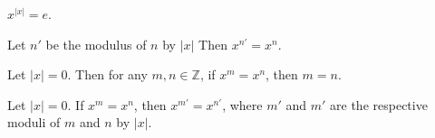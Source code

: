 \begin{theorem}
    \label{theorem : gpow_order_zero}
    \leanok
    $x^{|x|} = e$.
\end{theorem}

\begin{theorem}
    \label{theorem : gpow_mod_order}
    Let $n'$ be the modulus of $n$ by $|x|$ Then $x^{n'} = x^n$.
\end{theorem}

\begin{theorem}
    \label{theorem : gpow_inj_of_order_zero}
    Let $|x| = 0$. Then for any $m,n \in \mathbb{Z}$, if $x^m = x^n$, then $m = n$.
\end{theorem}

\begin{theorem}
    \label{theorem : mod_order_eq_of_gpow_eq}
    Let $|x| = 0$. If $x^m = x^n$, then $x^{m'} = x^{n'}$, where $m'$ and $m'$ are the respective moduli of $m$ and $n$ by $|x|$.
\end{theorem}
